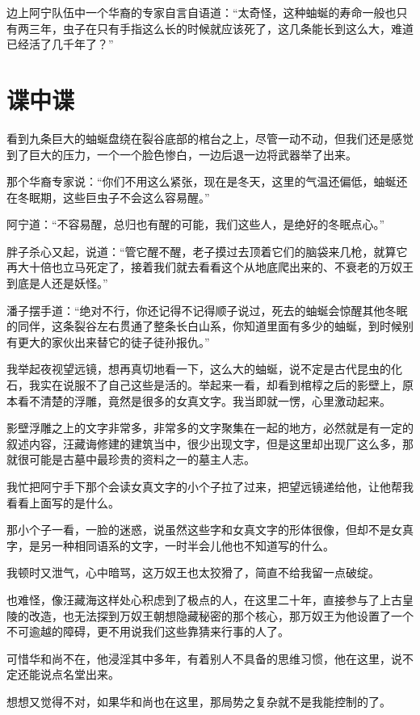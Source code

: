 边上阿宁队伍中一个华裔的专家自言自语道：“太奇怪，这种蚰蜒的寿命一般也只有两三年，虫子在只有手指这么长的时候就应该死了，这几条能长到这么大，难道已经活了几千年了？”

\chapter{谍中谍}

看到九条巨大的蚰蜒盘绕在裂谷底部的棺台之上，尽管一动不动，但我们还是感觉到了巨大的压力，一个一个脸色惨白，一边后退一边将武器举了出来。

那个华裔专家说：“你们不用这么紧张，现在是冬天，这里的气温还偏低，蚰蜒还在冬眠期，这些巨虫子不会这么容易醒。”

阿宁道：“不容易醒，总归也有醒的可能，我们这些人，是绝好的冬眠点心。”

胖子杀心又起，说道：“管它醒不醒，老子摸过去顶着它们的脑袋来几枪，就算它再大十倍也立马死定了，接着我们就去看看这个从地底爬出来的、不衰老的万奴王到底是人还是妖怪。”

潘子摆手道：“绝对不行，你还记得不记得顺子说过，死去的蚰蜒会惊醒其他冬眠的同伴，这条裂谷左右贯通了整条长白山系，你知道里面有多少的蚰蜒，到时候别有更大的家伙出来替它的徒子徒孙报仇。”

我举起夜视望远镜，想再真切地看一下，这么大的蚰蜒，说不定是古代昆虫的化石，我实在说服不了自己这些是活的。举起来一看，却看到棺椁之后的影壁上，原本看不清楚的浮雕，竟然是很多的女真文字。我当即就一愣，心里激动起来。

影壁浮雕之上的文字非常多，非常多的文字聚集在一起的地方，必然就是有一定的叙述内容，汪藏诲修建的建筑当中，很少出现文字，但是这里却出现厂这么多，那就很可能是古墓中最珍贵的资料之一的墓主人志。

我忙把阿宁手下那个会读女真文字的小个子拉了过来，把望远镜递给他，让他帮我看看上面写的是什么。

那小个子一看，一脸的迷惑，说虽然这些字和女真文字的形体很像，但却不是女真字，是另一种相同语系的文字，一时半会儿他也不知道写的什么。

我顿时又泄气，心中暗骂，这万奴王也太狡猾了，简直不给我留一点破绽。

也难怪，像汪藏海这样处心积虑到了极点的人，在这里二十年，直接参与了上古皇陵的改造，也无法探到万奴王朝想隐藏秘密的那个核心，那万奴王为他设置了一个不可逾越的障碍，更不用说我们这些靠猜来行事的人了。

可惜华和尚不在，他浸淫其中多年，有着别人不具备的思维习惯，他在这里，说不定还能说点名堂出来。

想想又觉得不对，如果华和尚也在这里，那局势之复杂就不是我能控制的了。

